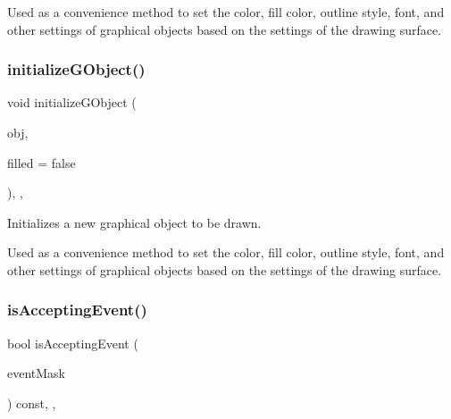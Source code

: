 Used as a convenience method to set the color, fill color, outline style, font, and other settings of graphical objects based on the settings of the drawing surface. \mbox{\label{classsgl_1_1GDrawingSurface_a43e6bc951980da061ddc40407daee227}} 
\subsubsection{\texorpdfstring{initialize\+G\+Object()}{initializeGObject()}\hspace{0.1cm}{\footnotesize\ttfamily [2/2]}}
{\footnotesize\ttfamily void initialize\+G\+Object (\begin{DoxyParamCaption}\item[{\mbox{\hyperlink{classsgl_1_1GObject}{G\+Object}} $\ast$}]{obj,  }\item[{bool}]{filled = {\ttfamily false} }\end{DoxyParamCaption})\hspace{0.3cm}{\ttfamily [protected]}, {\ttfamily [virtual]}, {\ttfamily [inherited]}}



Initializes a new graphical object to be drawn. 

Used as a convenience method to set the color, fill color, outline style, font, and other settings of graphical objects based on the settings of the drawing surface. \mbox{\label{classsgl_1_1GObservable_aeec1adc19aa0f33de62390686ee1382c}} 
\subsubsection{\texorpdfstring{is\+Accepting\+Event()}{isAcceptingEvent()}\hspace{0.1cm}{\footnotesize\ttfamily [1/3]}}
{\footnotesize\ttfamily bool is\+Accepting\+Event (\begin{DoxyParamCaption}\item[{int}]{event\+Mask }\end{DoxyParamCaption}) const\hspace{0.3cm}{\ttfamily [protected]}, {\ttfamily [virtual]}, {\ttfamily [inherited]}}



